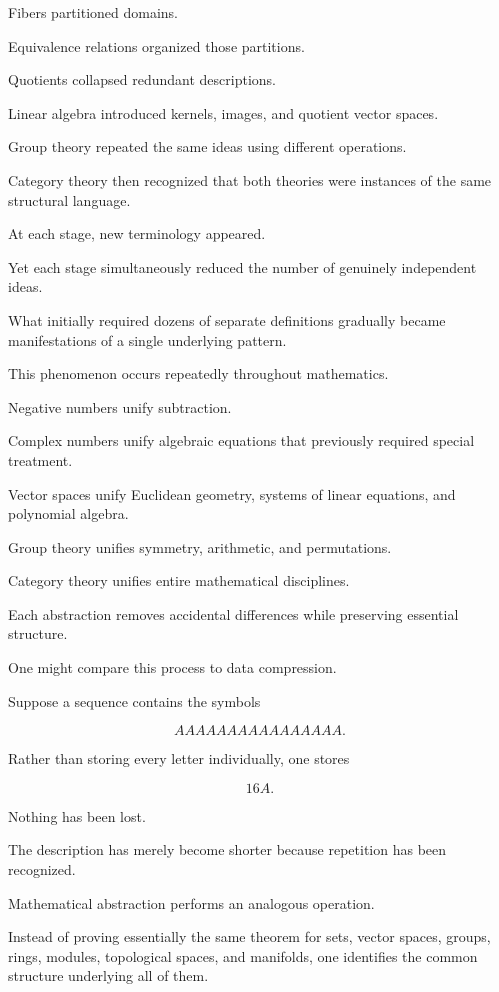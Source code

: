 \documentclass[11pt]{book}
\numberwithin{equation}{chapter}
\theoremstyle{definition}
\theoremstyle{plain}
\theoremstyle{remark}
\begin{document}
Fibers partitioned domains.

Equivalence relations organized those partitions.

Quotients collapsed redundant descriptions.

Linear algebra introduced kernels, images, and quotient vector spaces.

Group theory repeated the same ideas using different operations.

Category theory then recognized that both theories were instances of the same structural language.

At each stage, new terminology appeared.

Yet each stage simultaneously reduced the number of genuinely independent ideas.

What initially required dozens of separate definitions gradually became manifestations of a single underlying pattern.

This phenomenon occurs repeatedly throughout mathematics.

Negative numbers unify subtraction.

Complex numbers unify algebraic equations that previously required special treatment.

Vector spaces unify Euclidean geometry, systems of linear equations, and polynomial algebra.

Group theory unifies symmetry, arithmetic, and permutations.

Category theory unifies entire mathematical disciplines.

Each abstraction removes accidental differences while preserving essential structure.

One might compare this process to data compression.

Suppose a sequence contains the symbols

\[
AAAAAAAAAAAAAAAA.
\]

Rather than storing every letter individually, one stores

\[
16A.
\]

Nothing has been lost.

The description has merely become shorter because repetition has been recognized.

Mathematical abstraction performs an analogous operation.

Instead of proving essentially the same theorem for sets, vector spaces, groups, rings, modules, topological spaces, and manifolds, one identifies the common structure underlying all of them.
\end{document}
